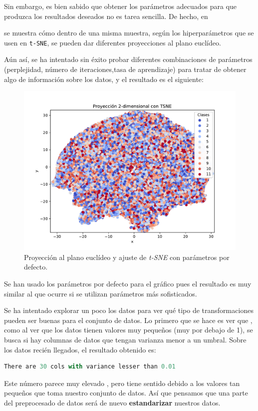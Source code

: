 \documentclass[a4paper, 20pt]{article}
\begin{document}

Sin embargo, es bien sabido que obtener los parámetros adecuados para que produzca los resultados deseados no es tarea sencilla. De hecho, en 


se muestra cómo dentro de una misma muestra, según los hiperparámetros que se usen en \lstinline{t-SNE}, se pueden dar diferentes proyecciones al plano euclídeo. 

Aún así, se ha intentado sin éxito probar diferentes combinaciones de parámetros (perplejidad, número de iteraciones,tasa de aprendizaje) para tratar de obtener algo de información sobre los datos, y el resultado es el siguiente:

\begin{figure}[H]
  \centering
  \includegraphics[width=0.55\linewidth]{media/tsne.pdf}
  \caption{Proyección al plano euclídeo y ajuste de \emph{t-SNE} con parámetros por defecto. }
  \label{fig:tsne}
\end{figure}

Se han usado los parámetros por defecto para el gráfico pues el resultado es muy similar al que ocurre si se utilizan parámetros más sofisticados.





Se ha intentado explorar un poco los datos para ver qué tipo de transformaciones pueden ser buenas para el conjunto de datos. Lo primero que se hace es ver que , como al ver que los datos tienen valores muy pequeños (muy por debajo de 1), se busca si hay columnas de datos que tengan varianza menor a un umbral. Sobre los datos recién llegados, el resultado obtenido es:
\begin{lstlisting}[language=Python]
  There are 30 cols with variance lesser than 0.01
\end{lstlisting}
Este número parece muy elevado , pero tiene sentido debido a los valores tan pequeños que toma nuestro conjunto de datos. Así que pensamos que una parte del preprocesado de datos será de nuevo \textbf{estandarizar} nuestros datos.
\end{document}
